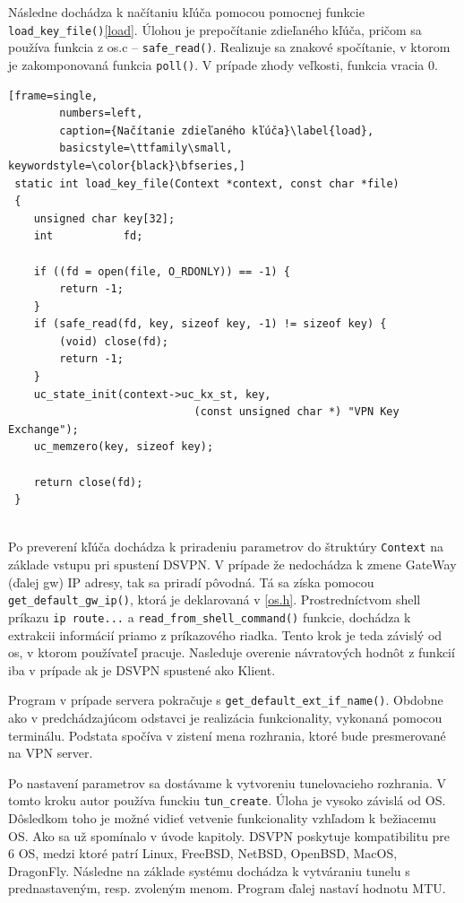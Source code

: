  Následne dochádza k načítaniu kľúča pomocou pomocnej funkcie 
\\
 \lstinline|load_key_file()|\ref{load}. Úlohou je prepočítanie zdieľaného kľúča, pričom sa používa funkcia z os.c -- \lstinline|safe_read()|. Realizuje sa znakové spočítanie, v ktorom je zakomponovaná funkcia  \lstinline|poll()|\cite{poll}. V prípade zhody veľkosti, funkcia vracia 0.
 
 \begin{minipage}{\linewidth} 	
 	\begin{lstlisting}[frame=single,
 		numbers=left,
 		caption={Načítanie zdieľaného kľúča}\label{load},
 		basicstyle=\ttfamily\small, keywordstyle=\color{black}\bfseries,]
 static int load_key_file(Context *context, const char *file)
 {
 	unsigned char key[32];
 	int           fd;
 	
 	if ((fd = open(file, O_RDONLY)) == -1) {
 		return -1;
 	}
 	if (safe_read(fd, key, sizeof key, -1) != sizeof key) {
 		(void) close(fd);
 		return -1;
 	}
 	uc_state_init(context->uc_kx_st, key, 
 							 (const unsigned char *) "VPN Key Exchange");
 	uc_memzero(key, sizeof key);
 	
 	return close(fd);
 }
  	\end{lstlisting}
\end{minipage}\\ 

 Po preverení kľúča dochádza k priradeniu parametrov do štruktúry \lstinline|Context| na základe vstupu pri spustení DSVPN. V prípade že nedochádza k zmene GateWay (ďalej \acrshort{gw}) IP adresy, tak sa priradí pôvodná. Tá sa získa pomocou \\\lstinline|get_default_gw_ip()|, ktorá je deklarovaná v \ref{os.h}. Prostredníctvom shell príkazu \lstinline|ip route...| a \lstinline|read_from_shell_command()| funkcie, dochádza k extrakcii informácií priamo z príkazového riadka. Tento krok je teda závislý od \acrshort{os}, v ktorom používateľ pracuje. Nasleduje overenie návratových hodnôt z funkcií iba v prípade ak je DSVPN spustené ako Klient.
 
 Program v prípade servera pokračuje s \lstinline|get_default_ext_if_name()|. Obdobne ako v predchádzajúcom odstavci je realizácia funkcionality, vykonaná pomocou terminálu. Podstata spočíva v zistení mena rozhrania, ktoré bude presmerované na VPN server. 
 
 Po nastavení parametrov sa dostávame k vytvoreniu tunelovacieho rozhrania. V tomto kroku autor používa  funckiu \lstinline|tun_create|. Úloha je vysoko závislá od OS. Dôsledkom toho je možné vidieť vetvenie funkcionality vzhľadom k bežiacemu OS. Ako sa už spomínalo v úvode kapitoly. DSVPN poskytuje kompatibilitu pre 6 OS, medzi ktoré  patrí Linux, FreeBSD, NetBSD, OpenBSD, MacOS, DragonFly. Následne na základe systému dochádza k vytváraniu tunelu s prednastaveným, resp. zvoleným menom. Program ďalej nastaví hodnotu MTU.
 

